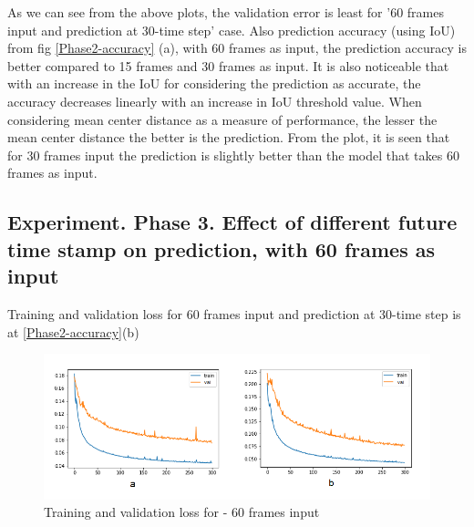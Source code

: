 




As we can see from the above plots, the validation error is least for '60 frames input and prediction at 30-time step' case. Also prediction accuracy (using IoU) from fig \ref{Phase2-accuracy} (a), with 60 frames as input, the prediction accuracy is better compared to 15 frames and 30 frames as input. It is also noticeable that with an increase in the IoU for considering the prediction as accurate, the accuracy decreases linearly with an increase in IoU threshold value. When considering mean center distance as a measure of performance, the lesser the mean center distance the better is the prediction. From the plot, it is seen that for 30 frames input the prediction is slightly better than the model that takes 60 frames as input.

\subsection{Experiment. Phase 3. Effect of different future time stamp on prediction, with 60 frames as input}
Training and validation loss for 60 frames input and prediction at 30-time step is at \ref{Phase2-accuracy}(b)

\begin{figure}[H] 
\includegraphics[scale=0.8]{Phase3-training}
\begin{center}
\caption{Training and validation loss for - 60 frames input}
\label{fig:Phase3-training}
\end{center}
\end{figure}

